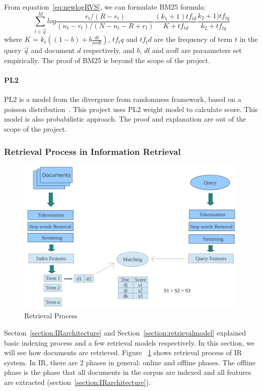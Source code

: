 From equation~\ref{eq:newlogRVS}, we can formulate BM25 formula:
\begin{equation}~\label{eq:BM25}
\sum_{t \in \vec{q}}^M log \frac{r_t/(R - r_t)}{(n_t - r_t)/(N - n_t - R + r_t)} \frac{(k_1 + 1)tf_{td}}{K + tf_{td}} \frac{k_2 + 1)tf_{tq}}{k_2 + tf_{tq}}
\end{equation}
where $K$ = $k_t((1 - b) + b\frac{dl}{avdl})$, $tf_tq$ and $tf_td$ are the frequency of term $t$ in the query $\vec{q}$ and document $d$ respectively,
and $b$, $dl$ and $avdl$ are paraameters set empirically. The proof of BM25 is beyond the scope of the project.

\paragraph{PL2} PL2 is a model from the divergence from randomness framework, based on a poisson distribution~\cite{craig}. This project uses PL2 weight model to 
calculate score. This model is also probabilistic approach. The proof and explanation are out of the scope of the project.


\subsubsection{Retrieval Process in Information Retrieval}\label{section:retrieving}
\begin{figure}
\centering
\includegraphics[scale=0.3]{./figures/retrieval.png}
\caption{Retrieval Process} \label{fig:retrieval} 
\end{figure}
Section~\ref{section:IRarchitecture} and Section~\ref{section:retrievalmodel} explained basic indexing process and a few retrieval models respectively.
In this section, we will see how documents are retrieved. Figure ~\ref{fig:retrieval} shows
retrieval process of IR system. In IR, there are 2 phases in general:
online and offline phases. The offline phase is the phase that all documents in the corpus are indexed and all features are extracted 
(section~\ref{section:IRarchitecture}). 

